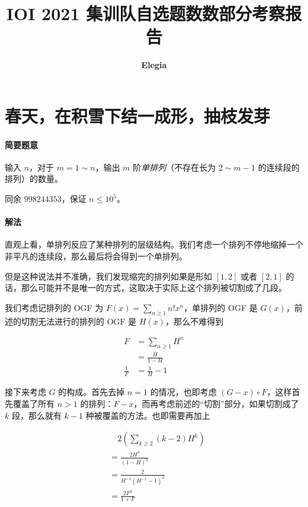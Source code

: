 \documentclass[12pt]{ctexart}
\title{\textbf{IOI 2021 集训队自选题数数部分考察报告}}
\author{\textbf{Elegia}}
\date{}
\theoremstyle{theorem}
\theoremstyle{theorem}
\begin{document}
\maketitle

\tableofcontents

\newpage

\section{春天，在积雪下结一成形，抽枝发芽}

\paragraph{简要题意} 输入 $n$，对于 $m=1\sim n$，输出 $m$ 阶\emph{单排列}（不存在长为 $2\sim m-1$ 的连续段的排列）的数量。

同余 $998244353$，保证 $n\le 10^5$。

\paragraph{解法}

直观上看，单排列反应了某种排列的层级结构。我们考虑一个排列不停地缩掉一个非平凡的连续段，那么最后将会得到一个单排列。

但是这种说法并不准确，我们发现缩完的排列如果是形如 $[1,2]$ 或者 $[2,1]$ 的话，那么可能并不是唯一的方式，这取决于实际上这个排列被切割成了几段。

我们考虑记排列的 OGF 为 $F(x) = \sum_{n\ge 1} n!x^n$，单排列的 OGF 是 $G(x)$，前述的切割无法进行的排列的 OGF 是 $H(x)$，那么不难得到

\begin{align*}
F &= \sum_{n\ge 1}H^n\\
&= \frac{H}{1-H}\\
\frac 1F &= \frac 1H - 1
\end{align*}

接下来考虑 $G$ 的构成。首先去掉 $n=1$ 的情况，也即考虑 $(G - x) \circ F$，这样首先覆盖了所有 $n>1$ 的排列：$F -x$，而再考虑前述的“切割”部分，如果切割成了 $k$ 段，那么就有 $k-1$ 种被覆盖的方法。也即需要再加上

\begin{align*}
&\quad 2\left(\sum_{k\ge 2} (k-2)H^k\right)\\
& = \frac{2H^3}{(1-H)^2}\\
&= \frac 2{H^{-1}(H^{-1}-1)^2}\\
&= \frac {2F^3}{1+F}
\end{align*}
\end{document}
